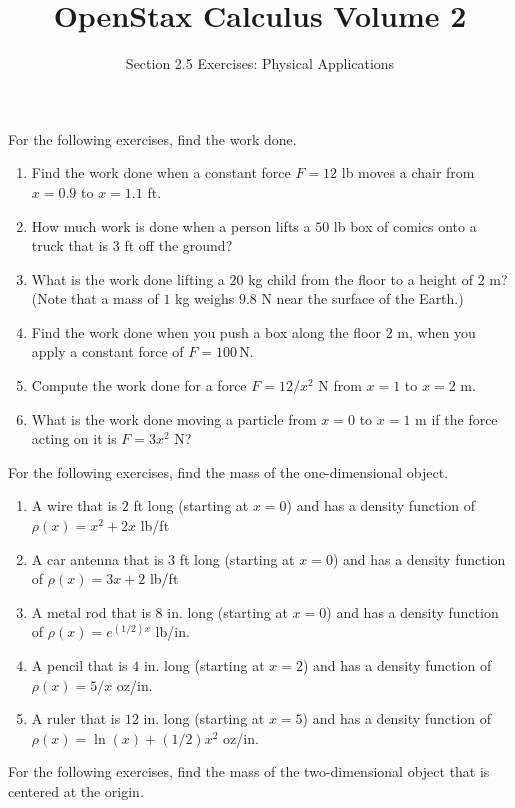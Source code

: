 \documentclass{exercises}
\title{OpenStax Calculus Volume 2}
\subtitle{Section 2.5 Exercises: Physical Applications}
\author{}
\date{}
\begin{document}
\maketitle


For the following exercises, find the work done.

\begin{enumerate}[start=1]
\item Find the work done when a constant force $F=12$ lb moves a chair from $x=0.9$ to $x=1.1$ ft.
\item How much work is done when a person lifts a $50$ lb box of comics onto a truck that is $3$ ft off the ground?
\item What is the work done lifting a $20$ kg child from the floor to a height of $2$ m? (Note that a mass of $1$ kg weighs $9.8$ N near the surface of the Earth.)
\item Find the work done when you push a box along the floor $2$ m, when you apply a constant force of $F=100\,\text{N}$.
\item Compute the work done for a force $F=12/x^{2}$ N from $x=1$ to $x=2$ m.
\item What is the work done moving a particle from $x=0$ to $x=1$ m if the force acting on it is $F=3x^{2}$ N?
\end{enumerate}

For the following exercises, find the mass of the one-dimensional object.

\begin{enumerate}[resume]
\item A wire that is $2$ ft long (starting at $x=0$) and has a density function of $\rho(x)=x^{2}+2x$ lb/ft
\item A car antenna that is $3$ ft long (starting at $x=0$) and has a density function of $\rho(x)=3x+2$ lb/ft
\item A metal rod that is $8$ in. long (starting at $x=0$) and has a density function of $\rho(x)=e^{(1/2)x}$ lb/in.
\item A pencil that is $4$ in. long (starting at $x=2$) and has a density function of $\rho(x)=5/x$ oz/in.
\item A ruler that is $12$ in. long (starting at $x=5$) and has a density function of $\rho(x)=\ln(x)+(1/2)x^{2}$ oz/in.
\end{enumerate}

For the following exercises, find the mass of the two-dimensional object that is centered at the origin.
\end{document}

